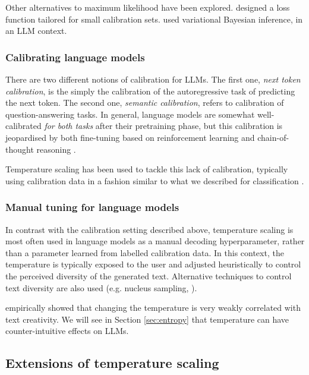 \documentclass[10pt,dvipsnames]{article}
\theoremstyle{plain}
\theoremstyle{definition}
\theoremstyle{remark}
\begin{document}
Other alternatives to maximum likelihood have been explored. \citet{mozafari2018attended} designed a loss function tailored for small calibration sets. \citet{shen2024thermometer} used variational Bayesian inference, in an LLM context.  

\subsubsection{Calibrating language models}

There are two different notions of calibration for LLMs. The first one, \emph{next token calibration}, is the simply the calibration of the autoregressive task of predicting the next token. The second one, \emph{semantic calibration}, refers to calibration of question-answering tasks.
In general, language models are somewhat well-calibrated \emph{for both tasks} after their pretraining phase, but this calibration is jeopardised by both fine-tuning based on reinforcement learning and chain-of-thought reasoning \citep{nakkiran2025trained}.

Temperature scaling has been used to tackle this lack of calibration, typically using calibration data in a fashion similar to what we described for classification  \citep{shen2024thermometer, xie2024calibrating}.

\subsubsection{Manual tuning for language models}

In contrast with the calibration setting described above, temperature scaling is most often used in language models as a manual decoding hyperparameter, rather than a parameter learned from labelled calibration data. In this context, the temperature is typically exposed to the user and adjusted heuristically to control the perceived diversity of the generated text. Alternative techniques to control text diversity are also used (e.g. nucleus sampling, \citealp{holtzman2020curious}).

 \citet{peeperkorn2024temperature} empirically showed that changing the temperature is very weakly correlated with text creativity. We will see in Section \ref{sec:entropy} that temperature can have counter-intuitive effects on LLMs.

\subsection{Extensions of temperature scaling}
\end{document}
